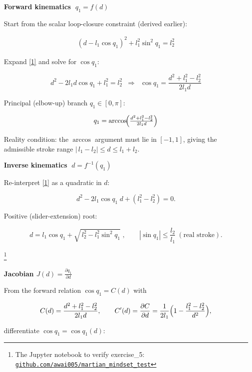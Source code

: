 \documentclass[12pt,a4paper]{article}
\begin{document}
\textbf{Forward kinematics  \(\;q_{1}=f(d)\)}

Start from the scalar loop-closure constraint (derived earlier):

\begin{align}\label{1}
(d-l_{1}\cos q_{1})^{2}+l_{1}^{2}\sin^{2}q_{1}=l_{2}^{2}
\end{align}

Expand \eqref{1} and solve for \(\cos q_{1}\):

\[
d^{2}-2l_{1}d\cos q_{1}+l_{1}^{2}=l_{2}^{2}
\;\;\Longrightarrow\;\;
%
\cos q_{1}= \frac{d^{2}+l_{1}^{2}-l_{2}^{2}}{2l_{1}d}
\]

Principal (elbow-up) branch \(q_{1}\in[0,\pi]\):

\[
q_{1}= \arccos\!\Bigl(\tfrac{d^{2}+l_{1}^{2}-l_{2}^{2}}{2l_{1}d}\Bigr)
\]

Reality condition: the $\arccos$ argument must lie in \([-1,1]\), giving the admissible stroke range
\(\bigl|\,l_{1}-l_{2}\bigr|\le d\le l_{1}+l_{2}\).

\textbf{Inverse kinematics  \(\;d=f^{-1}(q_{1})\)}

Re-interpret \eqref{1} as a quadratic in \(d\):

\[
d^{2}-2l_{1}\cos q_{1}\;d + (l_{1}^{2}-l_{2}^{2}) = 0.
\]

Positive (slider-extension) root:

\[%
d = l_{1}\cos q_{1}
    + \sqrt{\,l_{2}^{2}-l_{1}^{2}\sin^{2}q_{1}}\;,
\qquad
|\sin q_{1}|\le\frac{l_{2}}{l_{1}} \;(\text{real stroke}).
\]





\footnote{The Jupyter notebook to verify exercise_5: \href{https://github.com/Awai005/martian-mindset-mech-control-test/blob/main/code/notebooks/exercise_5_kinematics.ipynb}%
{\texttt{github.com/\textlangle awai005\textrangle/martian\_mindset\_test}}}



\textbf{Jacobian  \(\displaystyle J(d)=\frac{\partial q_{1}}{\partial d}\)}

From the forward relation \(\cos q_{1}=C(d)\) with

\[
C(d)=\frac{d^{2}+l_{1}^{2}-l_{2}^{2}}{2l_{1}d},
\qquad
C'(d)=\frac{\partial C}{\partial d}
      =\frac{1}{2l_{1}}\Bigl(1-\frac{l_{1}^{2}-l_{2}^{2}}{d^{2}}\Bigr),
\]

differentiate \(\cos q_{1}=\cos q_{1}(d)\):
\end{document}

